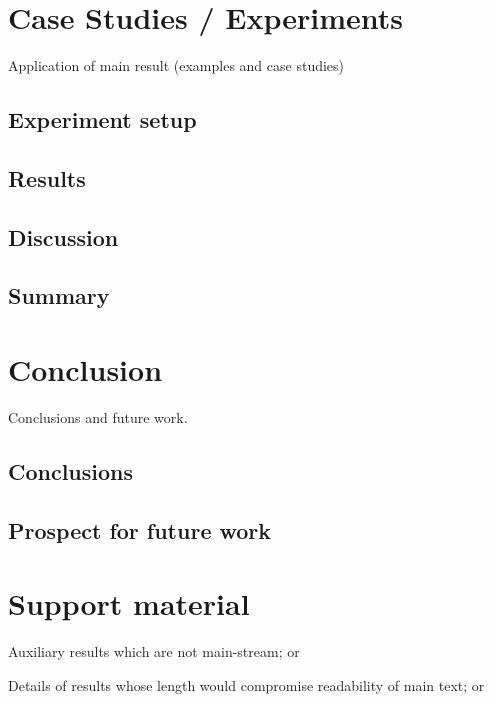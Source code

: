 \documentclass[
  oneside,
  11pt, a4paper,
  footinclude=true,
  headinclude=true,
  cleardoublepage=empty
]{scrbook}
\begin{document}
	\chapter{Case Studies / Experiments}
		Application of main result (examples and case studies)
	\section{Experiment setup}
    \section{Results}
    \section{Discussion}
	\section{Summary}

	\chapter{Conclusion}
		Conclusions and future work.
	\section{Conclusions}
	\section{Prospect for future work}
			

	

	
	
	
	\chapter{Support material}
	Auxiliary results which are not main-stream; or

	Details of results whose length would compromise readability of main text; or
\end{document}

